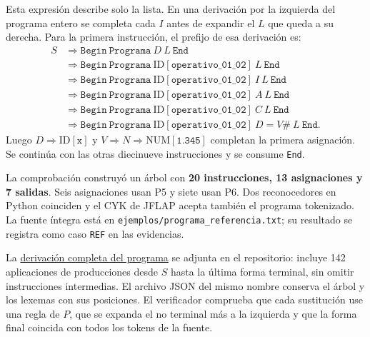 \documentclass[11pt,letterpaper]{article}
\newcommand{\cod}[1]{\texttt{#1}}
\newcommand{\ID}[1]{\ensuremath{\mathrm{ID}[\texttt{#1}]}}
\newcommand{\NUM}[1]{\ensuremath{\mathrm{NUM}[\texttt{#1}]}}
\newcommand{\repo}{https://github.com/Frante23/info1148-lab3}
\begin{document}
Esta expresión describe solo la lista. En una derivación por la izquierda del programa entero se completa cada $I$ antes de expandir el $L$ que queda a su derecha. Para la primera instrucción, el prefijo de esa derivación es:
\[
\begin{aligned}
S&\Rightarrow\cod{Begin}\ \cod{Programa}\ D\ L\ \cod{End}\\
 &\Rightarrow\cod{Begin}\ \cod{Programa}\ \ID{operativo\_01\_02}\ L\ \cod{End}\\
 &\Rightarrow\cod{Begin}\ \cod{Programa}\ \ID{operativo\_01\_02}\ I\ L\ \cod{End}\\
 &\Rightarrow\cod{Begin}\ \cod{Programa}\ \ID{operativo\_01\_02}\ A\ L\ \cod{End}\\
 &\Rightarrow\cod{Begin}\ \cod{Programa}\ \ID{operativo\_01\_02}\ C\ L\ \cod{End}\\
 &\Rightarrow\cod{Begin}\ \cod{Programa}\ \ID{operativo\_01\_02}\ D=V\#\ L\ \cod{End}.
\end{aligned}
\]
Luego $D\Rightarrow\ID{x}$ y $V\Rightarrow N\Rightarrow\NUM{1.345}$ completan la primera asignación. Se continúa con las otras diecinueve instrucciones y se consume \cod{End}.

La comprobación construyó un árbol con \textbf{20 instrucciones, 13 asignaciones y 7 salidas}. Seis asignaciones usan P5 y siete usan P6. Dos reconocedores en Python coinciden y el CYK de JFLAP acepta también el programa tokenizado. La fuente íntegra está en \cod{ejemplos/programa\_referencia.txt}; su resultado se registra como caso \cod{REF} en las evidencias.

La \href{\repo/blob/main/evidencias/derivaciones/programa_referencia.txt}{derivación completa del programa} se adjunta en el repositorio: incluye 142 aplicaciones de producciones desde $S$ hasta la última forma terminal, sin omitir instrucciones intermedias. El archivo JSON del mismo nombre conserva el árbol y los lexemas con sus posiciones. El verificador comprueba que cada sustitución use una regla de $P$, que se expanda el no terminal más a la izquierda y que la forma final coincida con todos los tokens de la fuente.

\newpage
\end{document}
